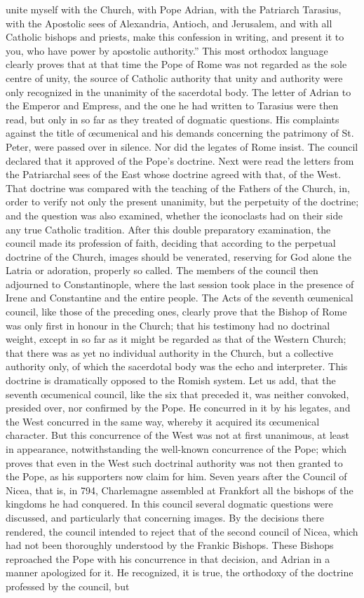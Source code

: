 unite myself with the Church, with Pope Adrian, with the Patriarch Tarasius, with the Apostolic sees of Alexandria, Antioch, and Jerusalem, and with all Catholic bishops and priests, make this confession in writing, and present it to you, who have power by apostolic authority.” This most orthodox language clearly proves that at that time the Pope of Rome was not regarded as the sole centre of unity, the source of Catholic authority that unity and authority were only recognized in the unanimity of the sacerdotal body. The letter of Adrian to the Emperor and Empress, and the one he had written to Tarasius were then read, but only in so far as they treated of dogmatic questions. His complaints against the title of œcumenical and his demands concerning the patrimony of St. Peter, were passed over in silence. Nor did the legates of Rome insist. The council declared that it approved of the Pope's doctrine. Next were read the letters from the Patriarchal sees of the East whose doctrine agreed with that, of the West. That doctrine was compared with the teaching of the Fathers of the Church, in, order to verify not only the present unanimity, but the perpetuity of the doctrine; and the question was also examined, whether the iconoclasts had on their side any true Catholic tradition. After this double preparatory examination, the council made its profession of faith, deciding that according to the perpetual doctrine of the Church, images should be venerated, reserving for God alone the Latria or adoration, properly so called. The members of the council then adjourned to Constantinople, where the last session took place in the presence of Irene and Constantine and the entire people. The Acts of the seventh œumenical council, like those of the preceding ones, clearly prove that the Bishop of Rome was only first in honour in the Church; that his testimony had no doctrinal weight, except in so far as it might be regarded as that of the Western Church; that there was as yet no individual authority in the Church, but a collective authority only, of which the sacerdotal body was the echo and interpreter. This doctrine is dramatically opposed to the Romish system. Let us add, that the seventh œcumenical council, like the six that preceded it, was neither convoked, presided over, nor confirmed by the Pope. He concurred in it by his legates, and the West concurred in the same way, whereby it acquired its œcumenical character. But this concurrence of the West was not at first unanimous, at least in appearance, notwithstanding the well-known concurrence of the Pope; which proves that even in the West such doctrinal authority was not then granted to the Pope, as his supporters now claim for him. Seven years after the Council of Nicea, that is, in 794, Charlemagne assembled at Frankfort all the bishops of the kingdoms he had conquered. In this council several dogmatic questions were discussed, and particularly that concerning images. By the decisions there rendered, the council intended to reject that of the second council of Nicea, which had not been thoroughly understood by the Frankic Bishops. These Bishops reproached the Pope with his concurrence in that decision, and Adrian in a manner apologized for it. He recognized, it is true, the orthodoxy of the doctrine professed by the council, but 
